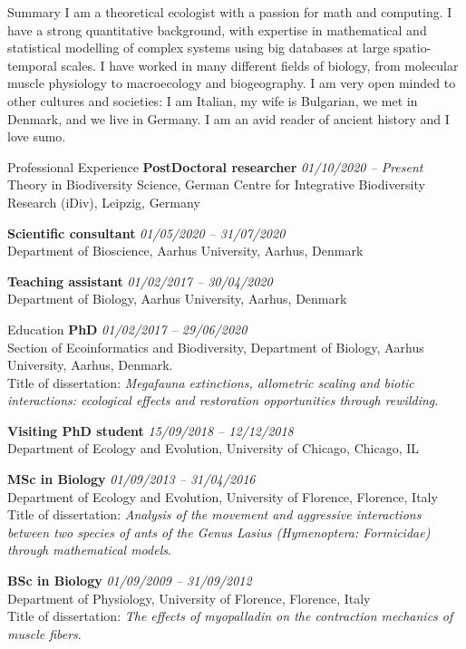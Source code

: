 \documentclass{resume} %
\begin{document}
\begin{rSection}{Summary}
I am a theoretical ecologist with a passion for math and computing.
I have a strong quantitative background, with expertise in mathematical and statistical modelling of complex systems using big databases at large spatio-temporal scales.
I have worked in many different fields of biology, from molecular muscle physiology to macroecology and biogeography.
I am very open minded to other cultures and societies: I am Italian, my wife is Bulgarian, we met in Denmark, and we live in Germany.
I am an avid reader of ancient history and I love sumo.
\end{rSection}

\begin{rSection}{Professional Experience}
{\bf PostDoctoral researcher} \hfill {\em 01/10/2020 -- Present}\\
Theory in Biodiversity Science, German Centre for Integrative Biodiversity Research (iDiv), Leipzig, Germany

{\bf Scientific consultant} \hfill {\em 01/05/2020 -- 31/07/2020}\\
Department of Bioscience, Aarhus University, Aarhus, Denmark

{\bf Teaching assistant} \hfill {\em 01/02/2017 -- 30/04/2020}\\
Department of Biology, Aarhus University, Aarhus, Denmark
\end{rSection}

\begin{rSection}{Education}
{\bf PhD} \hfill {\em 01/02/2017 -- 29/06/2020} 
\\ Section of Ecoinformatics and Biodiversity, Department of Biology, Aarhus University, Aarhus, Denmark.
\\ Title of dissertation: \textit{Megafauna extinctions, allometric scaling and biotic interactions: ecological effects and restoration opportunities through rewilding}.

{\bf Visiting PhD student} \hfill {\em 15/09/2018 -- 12/12/2018}
\\ Department of Ecology and Evolution, University of Chicago, Chicago, IL

{\bf MSc in Biology} \hfill {\em 01/09/2013 -- 31/04/2016}
\\ Department of Ecology and Evolution, University of Florence, Florence, Italy
\\ Title of dissertation: \textit{Analysis of the movement and aggressive interactions between two species of ants of the Genus Lasius (Hymenoptera: Formicidae) through mathematical models}.

{\bf BSc in Biology} \hfill {\em 01/09/2009 -- 31/09/2012}
\\ Department of Physiology, University of Florence, Florence, Italy
\\ Title of dissertation: \textit{The effects of myopalladin on the contraction mechanics of muscle fibers}.
\end{rSection}
\end{document}

